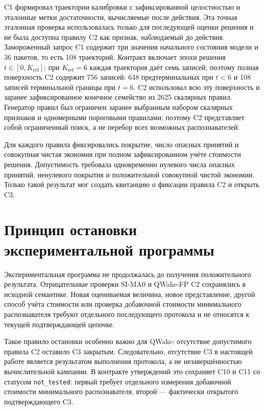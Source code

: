 C1 формировал траектории калибровки с зафиксированной целостностью и эталонные
метки достаточности, вычисляемые после действия. Эта точная эталонная проверка
использовалась только для последующей оценки решения и не была доступна
правилу C2 как признак, наблюдаемый до действия. Замороженный запрос C1
содержит три значения начального состояния модели и 36 пакетов, то есть 108
траекторий. Контракт включает эпохи решения $t\in[0,K_{\mathrm{ref}}]$; при
$K_{\mathrm{ref}}=6$ каждая траектория даёт семь записей, поэтому полная
поверхность C2 содержит 756 записей: 648 предтерминальных при $t<6$ и 108
записей терминальной границы при $t=6$. C2 использовал всю эту поверхность и
заранее зафиксированное конечное семейство из 2625 скалярных правил. Генератор
правил был ограничен заранее выбранным набором скалярных признаков и
одномерными пороговыми правилами; поэтому C2 представляет собой ограниченный
поиск, а не перебор всех возможных распознавателей.

Для каждого правила фиксировались покрытие, число опасных принятий и
совокупная чистая экономия при полном зафиксированном учёте стоимости решения.
Допустимость требовала одновременно нулевого числа опасных принятий,
ненулевого покрытия и положительной совокупной чистой экономии. Только такой
результат мог создать квитанцию о фиксации правила C2 и открыть C3.

\section{Принцип остановки экспериментальной программы}
\label{sec:experiment-stopping}

Экспериментальная программа не продолжалась до получения положительного
результата. Отрицательные проверки SI-MA0 и QWake-FP C2 сохранялись в исходной
семантике. Новая оцениваемая величина, новое представление, другой способ учёта
стоимости или проверка добавочной стоимости минимального распознавателя требуют
отдельного последующего протокола и не относятся к текущей подтверждающей
цепочке.

Такое правило остановки особенно важно для QWake: отсутствие допустимого
правила C2 оставило C3 закрытым. Следовательно, отсутствие C3 в настоящей работе
является результатом выполнения протокола, а не незавершённостью вычислительной
кампании. В контракте утверждений это сохраняет C10 и C11 со статусом
\texttt{not\_tested}: первый требует отдельного измерения добавочной стоимости
минимального распознавателя, второй --- фактически открытого подтверждающего C3.
